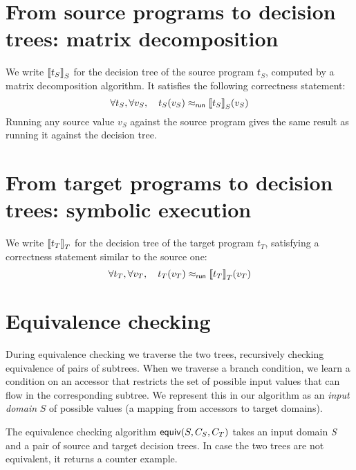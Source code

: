 \documentclass[12pt]{article}
\begin{document}
\section{From source programs to decision trees: matrix decomposition}

We write ${\llbracket{t_S}\rrbracket}_S$ for the decision tree of the source program
$t_S$, computed by a matrix decomposition algorithm.
It satisfies the following correctness statement:
\[
\forall t_S, \forall v_S, \quad t_S(v_S) \mathrel{\approx_{\mathsf{run}}} {\llbracket{t_S}\rrbracket}_S(v_S)
\]
Running any source value $v_S$ against the source program gives the
same result as running it against the decision tree.


\section{From target programs to decision trees: symbolic execution}

We write ${\llbracket{t_T}\rrbracket}_T$ for the decision tree of the target program
$t_T$, satisfying a correctness statement similar to the source one:
\[
\forall t_T, \forall v_T, \quad t_T(v_T) \mathrel{\approx_{\mathsf{run}}} {\llbracket{t_T}\rrbracket}_T(v_T)
\]

\section{Equivalence checking}

During equivalence checking we traverse the two trees, recursively checking equivalence of pairs of subtrees.
When we traverse a branch condition, we learn a condition
on an accessor that restricts the set of possible input values that can flow in the corresponding subtree.
We represent this in our algorithm as an \emph{input domain} $S$ of possible values (a mapping from accessors to target domains).

The equivalence checking algorithm $\mathsf{equiv}(S, C_S, C_T)$ takes an input domain \emph{S} and a pair of source and target decision trees. In case the two trees are not equivalent, it returns a counter example.
\end{document}
